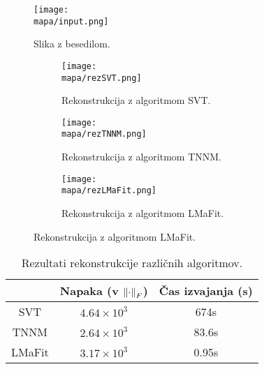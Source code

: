 \renewcommand{\mapa}{Poglavja/Slike/besedilo}

\begin{figure}[!ht]
    \centering
    \texttt{[image: \\mapa/input.png]}
    \caption{Slika z besedilom.}
\end{figure}

\begin{figure}[!ht]
    \begin{subfigure}{0.325\linewidth}
        \texttt{[image: \\mapa/rezSVT.png]}
        \caption{Rekonstrukcija z algoritmom SVT.}
    \end{subfigure}
    \hfill
    \begin{subfigure}{0.325\linewidth}
        \texttt{[image: \\mapa/rezTNNM.png]}
        \caption{Rekonstrukcija z algoritmom TNNM.}
    \end{subfigure}
    \hfill
    \begin{subfigure}{0.325\linewidth}
        \texttt{[image: \\mapa/rezLMaFit.png]}
        \caption{Rekonstrukcija z algoritmom LMaFit.}
    \end{subfigure}
\end{figure}

\begin{table}[!ht]
    \centering
    \begin{tabular}{|c|c|c|}
    \hline
    & Napaka (v $\left\lVert\cdot\right\rVert_F$) & Čas izvajanja (s) \\
    \hline
    SVT & $4.64 \times 10^{3}$ & 674s \\
    TNNM & $2.64 \times 10^{3}$ & 83.6s \\
    LMaFit & $3.17 \times 10^{3}$ & 0.95s \\
    \hline
    \end{tabular}
    \caption{Rezultati rekonstrukcije različnih algoritmov.}
\end{table}
